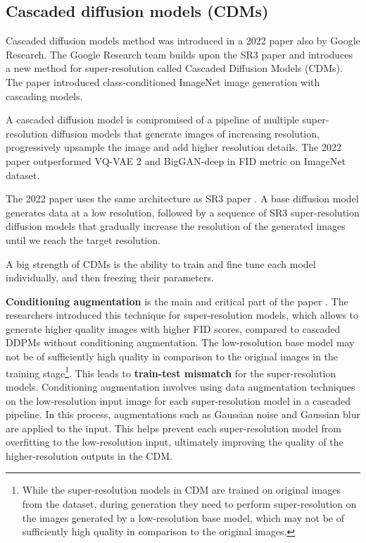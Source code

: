 \subsection{Cascaded diffusion models (CDMs)}

Cascaded diffusion models method was introduced in a 2022 paper \cite{cascaded_diffusion_models} also by Google Research. The Google Research team builds upon the SR3 paper \cite{sr3} and introduces a new method for super-resolution called Cascaded Diffusion Models (CDMs). The paper introduced class-conditioned ImageNet image generation with cascading models.

A cascaded diffusion model is compromised of a pipeline of multiple super-resolution diffusion models that generate images of increasing resolution, progressively upsample the image and add higher resolution details. The 2022 paper \cite{cascaded_diffusion_models} outperformed VQ-VAE 2 \cite{vqvae2} and BigGAN-deep \cite{biggan_deep} in FID metric on ImageNet dataset.

The 2022 paper \cite{cascaded_diffusion_models} uses the same architecture as SR3 paper \cite{sr3}. A base diffusion model generates data at a low resolution, followed by a sequence of SR3 super-resolution diffusion models that gradually increase the resolution of the generated images until we reach the target resolution.

A big strength of CDMs is the ability to train and fine tune each model individually, and then freezing their parameters.

\textbf{Conditioning augmentation} is the main and critical part of the paper \cite{cascaded_diffusion_models}. The researchers introduced this technique for super-resolution models, which allows to generate higher quality images with higher FID scores, compared to cascaded DDPMs without conditioning augmentation. The low-resolution base model may not be of sufficiently high quality in comparison to the original images in the training stage\footnote{While the super-resolution models in CDM are trained on original images from the dataset, during generation they need to perform super-resolution on the images generated by a low-resolution base model, which may not be of sufficiently high quality in comparison to the original images.}. This leads to \textbf{train-test mismatch} for the super-resolution models. Conditioning augmentation involves using data augmentation techniques on the low-resolution input image for each super-resolution model in a cascaded pipeline. In this process, augmentations such as Gaussian noise and Gaussian blur are applied to the input. This helps prevent each super-resolution model from overfitting to the low-resolution input, ultimately improving the quality of the higher-resolution outputs in the CDM.

